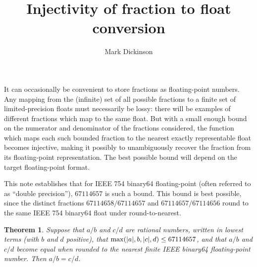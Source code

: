 \documentclass[a4paper]{article}
\title{Injectivity of fraction to float conversion}
\author{Mark Dickinson}
\DeclarePairedDelimiter\abs{\lvert}{\rvert}
\theoremstyle{plain}
\newtheorem{theorem}{Theorem}
\begin{document}
\maketitle

It can occasionally be convenient to store fractions as floating-point numbers.
Any mapping from the (infinite) set of all possible fractions to a finite set
of limited-precision floats must necessarily be lossy: there will be examples
of different fractions which map to the same float. But with a small enough
bound on the numerator and denominator of the fractions considered, the
function which maps each such bounded fraction to the nearest exactly
representable float becomes injective, making it possibly to unambiguously
recover the fraction from its floating-point representation. The best possible
bound will depend on the target floating-point format.

This note establishes that for IEEE 754 binary64 floating-point (often referred
to as ``double precision''), $67114657$ is such a bound. This bound is best
possible, since the distinct fractions $67114658 / 67114657$ and $67114657 /
67114656$ round to the same IEEE 754 binary64 float under round-to-nearest.

\begin{theorem}
    Suppose that $a/b$ and $c/d$ are rational numbers, written in lowest terms
    (with $b$ and $d$ positive), that $\max(\abs{a}, b, \abs{c}, d) \le
    67114657$, and that $a/b$ and $c/d$ become equal when rounded to the
    nearest finite IEEE binary64 floating-point number. Then $a/b = c/d$.
\end{theorem}
\end{document}
